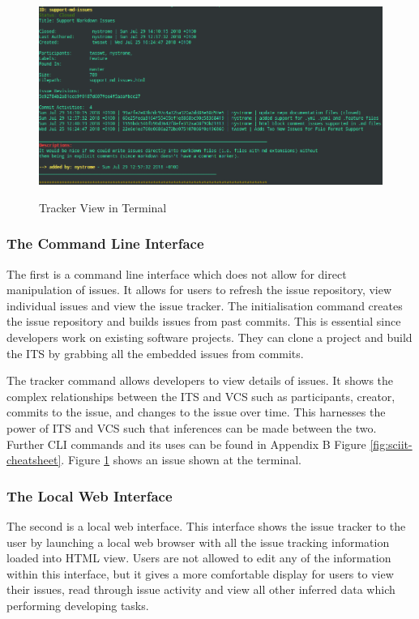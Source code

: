 \documentclass{mproj}
\begin{document}
\begin{figure}
\centering
  \caption{Tracker View in Terminal}
  \includegraphics[width=15cm]{sciit-tracker-shot}
  \label{fig:sciit-tracker-shot}
\end{figure}

\subsubsection{The Command Line Interface}

The first is a command line interface which does not allow for direct manipulation of issues. It allows for users to refresh the issue repository, view individual issues and view the issue tracker. The initialisation command creates the issue repository and builds issues from past commits. This is essential since developers work on existing software projects. They can clone a project and build the ITS by grabbing all the embedded issues from commits. 

The tracker command allows developers to view details of issues. It shows the complex relationships between the ITS and VCS such as participants, creator, commits to the issue, and changes to the issue over time. This harnesses the power of ITS and VCS such that inferences can be made between the two. Further CLI commands and its uses can be found in Appendix B Figure \ref{fig:sciit-cheatsheet}. Figure \ref{fig:sciit-tracker-shot} shows an issue shown at the terminal.

\subsubsection{The Local Web Interface}

The second is a local web interface. This interface shows the issue tracker to the user by launching a local web browser with all the issue tracking information loaded into HTML view. Users are not allowed to edit any of the information within this interface, but it gives a more comfortable display for users to view their issues, read through issue activity and view all other inferred data which performing developing tasks.
\end{document}
